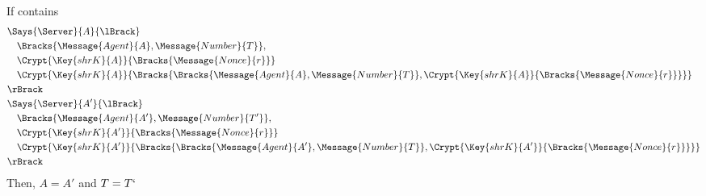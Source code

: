 \begin{theorem}
  If  contains
  \begin{align*}
    & \Says{\Server}{A}{\lBrack} \\
      & \quad \Bracks{\Message{Agent}{A}, \Message{Number}{T}}, \\
      & \quad \Crypt{\Key{shrK}{A}}{\Bracks{\Message{Nonce}{r}}} \\
      & \quad \Crypt{\Key{shrK}{A}}{\Bracks{\Bracks{\Message{Agent}{A}, \Message{Number}{T}},\Crypt{\Key{shrK}{A}}{\Bracks{\Message{Nonce}{r}}}}} \\
    & \rBrack \\
    & \Says{\Server}{A'}{\lBrack} \\
      & \quad \Bracks{\Message{Agent}{A'}, \Message{Number}{T'}}, \\
      & \quad \Crypt{\Key{shrK}{A'}}{\Bracks{\Message{Nonce}{r}}} \\
      & \quad \Crypt{\Key{shrK}{A'}}{\Bracks{\Bracks{\Message{Agent}{A'}, \Message{Number}{T}},\Crypt{\Key{shrK}{A'}}{\Bracks{\Message{Nonce}{r}}}}} \\
    & \rBrack
  \end{align*}
  Then, $A = A'$ and $T = T`$
\end{theorem}
